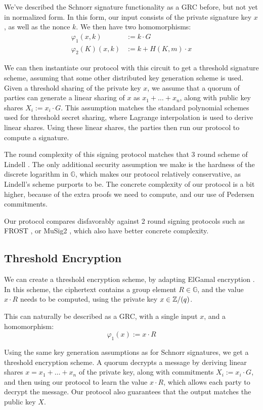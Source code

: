 We've described the Schnorr signature functionality as a GRC before,
but not yet in normalized form. In this form, our input consists
of the private signature key $x$, as well as the nonce $k$.
We then have two homomorphisms:
$$
\begin{aligned}
    \varphi_1(x, k) &:= k \cdot G\\
    \varphi_2(K)(x, k) &:= k + H(K, m) \cdot x
\end{aligned}
$$

We can then instantiate our protocol with this circuit to get a
threshold signature scheme, assuming that some other distributed
key generation scheme is used.
Given a threshold sharing of the private key $x$,
we assume that a quorum of parties can generate a linear sharing
of $x$ as $x_1 + \ldots + x_n$, along with public key shares $X_i := x_i \cdot G$.
This assumption matches the standard polynomial schemes used
for threshold secret sharing, where Lagrange interpolation is used
to derive linear shares.
Using these linear shares, the parties then run our protocol
to compute a signature.

The round complexity of this signing protocol matches
that 3 round scheme of Lindell \cite{lindell_simple_2022}.
The only additional security assumption we make is the hardness
of the discrete logarithm in $\mathbb{G}$, which makes our protocol
relatively conservative, as Lindell's scheme purports to be.
The concrete complexity of our protocol is a bit higher, because of
the extra proofs we need to compute, and our use of Pedersen commitments.

Our protocol compares disfavorably against 2 round signing protocols
such as FROST \cite{komlo_frost_2020}, or MuSig2 \cite{nick_musig2_2021},
which also have better concrete complexity.

\subsection{Threshold Encryption}
\label{sec:threshold_enc}

We can create a threshold encryption scheme, by adapting
ElGamal encryption \cite{elgamal_public_1985}.
In this scheme, the ciphertext contains a group element $R \in \mathbb{G}$,
and the value $x \cdot R$ needs to be computed, using the private key
$x \in \mathbb{Z}/(q)$. 

This can naturally be described as a GRC, with a single input $x$,
and a homomorphism:
$$
\varphi_1(x) := x \cdot R
$$

Using the same key generation assumptions as for Schnorr signatures,
we get a threshold encryption scheme.
A quorum decrypts a message by deriving linear shares $x = x_1 + \ldots + x_n$
of the private key, along with commitments $X_i := x_i \cdot G$,
and then using our protocol to learn the value $x \cdot R$,
which allows each party to decrypt the message.
Our protocol also guarantees that the output matches the public key $X$.

